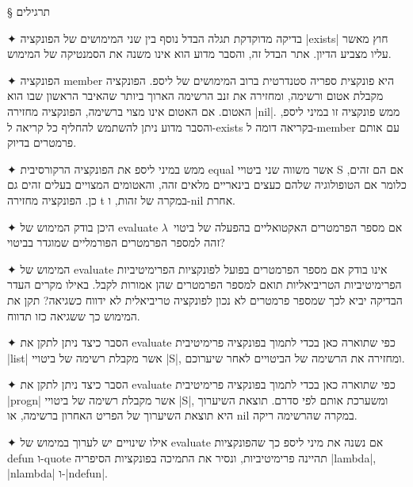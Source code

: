 \begin{LTR}
  
\end{LTR}

§ תרגילים
\begin{enumerate}
  ✦ בדיקה מדוקדקת תגלה הבדל נוסף בין שני המימושים של הפונקציה \E|exists| חוץ מאשר
  עליו מצביע הדיון. אתר הבדל זה, והסבר מדוע הוא אינו משנה את הסמנטיקה של המימוש.

  ✦ הפונקציה member היא פונקצית ספריה סטנדרטית ברוב המימושים של ליספ. הפונקציה
  מקבלת אטום ורשימה, ומחזירה את זנב הרשימה הארוך ביותר שהאיבר הראשון שבו הוא
  האטום. אם האטום אינו מצוי ברשימה, הפונקציה מחזירה \E|nil|. ממש פונקציה זו
  במיני ליספ, והסבר מדוע ניתן להשתמש להחליף כל קריאה ל-exists בקריאה דומה
  ל-member עם אותם פרמטרים בדיוק.

  ✦ ממש במיני ליספ את הפונקציה הרקורסיבית equal אשר משווה שני ביטויי S אם הם
  זהים, כלומר אם הטופולוגיה שלהם כעצים בינאריים מלאים זהה, והאטומים המצויים בעלים
  זהים גם כן. הפונקציה מחזירה t במקרה של זהות, ו-nil אחרת.

  ✦ היכן בודק המימוש של evaluate אם מספר הפרמטרים האקטואליים בהפעלה של ביטוי~$λ$
  זהה למספר הפרמטרים הפורמליים שמוגדר בביטוי?

  ✦ המימוש של evaluate אינו בודק אם מספר הפרמטרים בפועל לפונקציות הפרימיטיביות
  הפרימיטיביות הטריביאליות תואם למספר הפרמטרים שהן אמורות לקבל. באילו מקרים העדר
  הבדיקה יביא לכך שמספר פרמטרים לא נכון לפונקציה טריביאלית לא ידווח כשגיאה? תקן
  את המימוש כך ששגיאה כזו תדווח.

  ✦ הסבר כיצד ניתן לתקן את evaluate כפי שתוארה כאן בכדי לתמוך בפונקציה פרימיטיבית
  \E|list| אשר מקבלת רשימה של ביטויי \E|S|, ומחזירה את הרשימה של הביטויים לאחר
  שיערוכם.

  ✦ הסבר כיצד ניתן לתקן את evaluate כפי שתוארה כאן בכדי לתמוך בפונקציה פרימיטיבית
  \E|progn| אשר מקבלת רשימה של ביטויי \E|S|, ומשערכת אותם לפי סדרם. תוצאת השיערוך
  היא תוצאת השיערוך של הפריט האחרון ברשימה, או nil במקרה שהרשימה ריקה.

  ✦ אילו שינויים יש לערוך במימוש של evaluate אם נשנה את מיני ליספ כך שהפונקציות
  defun ו-quote תהיינה פרימיטיביות, ונסיר את התמיכה בפונקציות הסיפריה \E|lambda|,
  \E|nlambda| ו-\E|ndefun|.


\end{enumerate}
